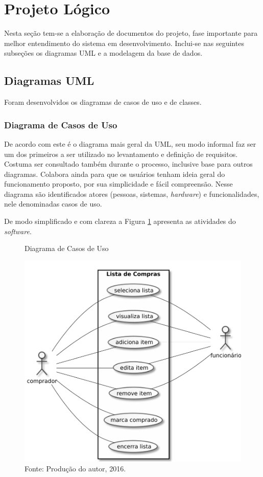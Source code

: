 \documentclass[
	12pt,
	openright,
	oneside, %
	a4paper,
	chapter=TITLE,
	section=TITLE,
	english,
	brazil %
	]{abntex2-udesc}
\begin{document}
\section{Projeto Lógico}

Nesta seção tem-se a elaboração de documentos do projeto, fase importante para melhor entendimento do sistema em desenvolvimento. Inclui-se nas seguintes subseções os diagramas UML e a modelagem da base de dados.

\subsection{Diagramas UML}

Foram desenvolvidos os diagramas de casos de uso e de classes.

\subsubsection{Diagrama de Casos de Uso}

De acordo com  este é o diagrama mais geral da UML, seu modo informal faz ser um dos primeiros a ser utilizado no levantamento e definição de requisitos. Costuma ser consultado também durante o processo, inclusive base para outros diagramas. Colabora ainda para que os usuários tenham ideia geral do funcionamento proposto, por sua simplicidade e fácil compreensão. Nesse diagrama são identificados atores (pessoas, sistemas, \textit{hardware}) e funcionalidades, nele denominadas casos de uso.

De modo simplificado e com clareza a Figura \ref{fig:usecase} apresenta as atividades do \textit{software}.

\begin{figure}[h]
\caption{Diagrama de Casos de Uso}\label{fig:usecase}
\centering
\includegraphics{figures/usecase.pdf}
\caption*{\footnotesize Fonte: Produção do autor, 2016.}
\end{figure}
\end{document}
